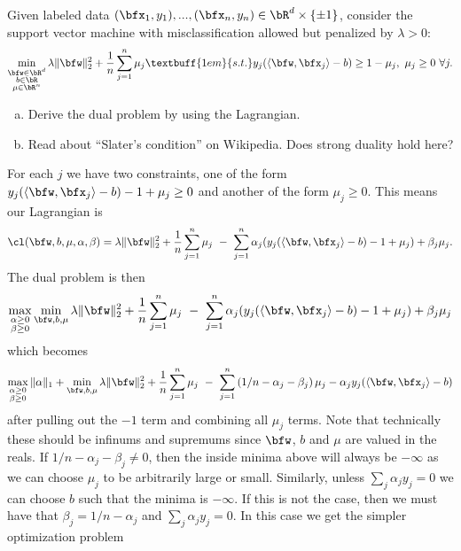 \begin{homework}[e]
  \prob Given labeled data $(\bfx_1,y_1),...,(\bfx_n,y_n)\in \bR^d \times \{\pm 1\}$, consider the support vector machine with misclassification allowed but penalized by $\lambda > 0$:
    \begin{align*}
      \min_{\substack{\bfw\in \bR^d\\ b\in \bR\\\mu\in \bR^n}} \lambda \|\bfw\|^2_2 + \frac{1}{n}\sum^n_{j=1} \mu_j \textbuff{1em}{s.t.} y_j(\langle \bfw, \bfx_j \rangle - b) \geq 1 - \mu_j, ~ \mu_j \geq 0 ~\forall j.
    \end{align*}
    \begin{enumerate}[(a)]
      \item Derive the dual problem by using the Lagrangian.
      \item Read about ``Slater's condition'' on Wikipedia. Does strong duality hold here?
    \end{enumerate}
    \begin{prf}
      For each $j$ we have two constraints, one of the form $y_j(\langle \bfw, \bfx_j \rangle - b) - 1 + \mu_j\geq 0$ and another of the form $\mu_j \geq 0$. This means our Lagrangian is
      \begin{align*}
        \cl(\bfw, b,\mu,\alpha,\beta) = \lambda \|\bfw\|^2_2 + \frac{1}{n} \sum_{j=1}^n \mu_j ~-~ \sum_{j=1}^n \alpha_j(y_j(\langle \bfw, \bfx_j\rangle - b) -1 + \mu_j) + \beta_j\mu_j.
      \end{align*}
      The dual problem is then
      \begin{align*}
        \max_{\substack{\alpha \geq 0 \\ \beta\geq 0}} \min_{\bfw, b, \mu} \lambda \|\bfw\|^2_2 + \frac{1}{n}\sum_{j=1}^n\mu_j ~-~\sum_{j=1}^n \alpha_j(y_j(\langle \bfw, \bfx_j\rangle - b) -1 + \mu_j) + \beta_j\mu_j
      \end{align*}
      which becomes
      \begin{align*} 
        \max_{\substack{\alpha \geq 0 \\ \beta\geq 0}} \|\alpha\|_1 + \min_{\bfw, b, \mu} \lambda \|\bfw\|^2_2 + \frac{1}{n}\sum_{j=1}^n\mu_j ~-~\sum_{j=1}^n \left(1/n - \alpha_j - \beta_j\right)\mu_j - \alpha_jy_j(\langle \bfw,\bfx_j \rangle - b)\\
      \end{align*}
      after pulling out the $-1$ term and combining all $\mu_j$ terms. Note that technically these should be infinums and supremums since $\bfw$, $b$ and $\mu$ are valued in the reals. If $1/n - \alpha_j - \beta_j\neq 0$, then the inside minima above will always be $-\infty$ as we can choose $\mu_j$ to be arbitrarily large or small. Similarly, unless $\sum_j\alpha_jy_j = 0$ we can choose $b$ such that the minima is $-\infty$. If this is not the case, then we must have that $\beta_j = 1/n - \alpha_j$ and $\sum_j\alpha_jy_j = 0$. In this case we get the simpler optimization problem

\end{prf}
\end{homework}
